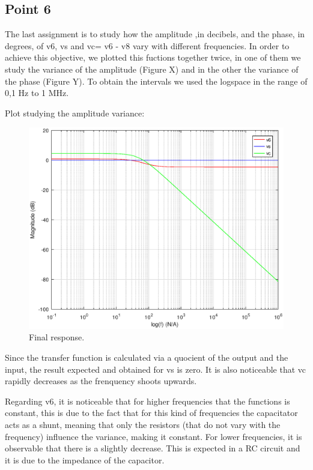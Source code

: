 \subsection{Point 6}
The last assignment is to study how the amplitude ,in decibels, and the phase, in degrees, of v6, vs and vc= v6 - v8 vary with different frequencies. In order to achieve this objective, we plotted this fuctions together twice, in one of them we study the variance of the amplitude (Figure X) and in the other the variance of the phase (Figure Y). To obtain the intervals we used the logspace in the range of 0,1 Hz to 1 MHz.
\par Plot studying the amplitude variance:
\begin{figure}[H] \centering
\includegraphics[width=0.6\linewidth]{freq6SC.eps}
\caption{Final response.}
\label{fig:point61}
\end{figure}
Since the transfer function is calculated via a quocient of the output and the input, the result expected and obtained for vs is zero.
It is also noticeable that vc rapidly decreases as the frenquency shoots upwards.\par
Regarding v6, it is noticeable that for higher frequencies that the functions is constant, this is due to the fact that for this kind of frequencies the capacitator
acts as a shunt, meaning that only the resistors (that do not vary with the frequency) influence the variance, making it constant. For lower frequencies, it is observable that
there is a slightly decrease. This is expected in a RC circuit and it is due to the impedance of the capacitor.

